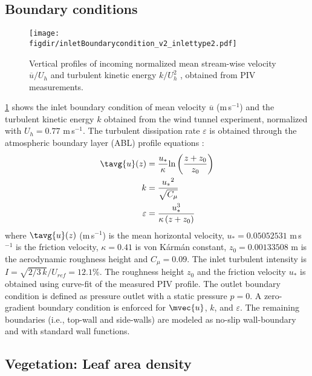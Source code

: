 \subsection{Boundary conditions}

\begin{figure}[t]
	\centering
	\texttt{[image: \\figdir/inletBoundarycondition\_v2\_inlettype2.pdf]}
	\caption{Vertical profiles of incoming normalized  mean stream-wise velocity $\overline{u}/U_h$ and   turbulent kinetic energy $k/U_h^2$ , obtained from PIV measurements.}
	\label{fig:boundaryprofile}
\end{figure}

\cref{fig:boundaryprofile} shows the inlet boundary condition of mean velocity $\overline{u}$ (m\,s$^{-1}$) and the turbulent kinetic energy $k$ obtained from the wind tunnel experiment, normalized with $U_h = 0.77$ m\,s$^{-1}$. The turbulent dissipation rate $\varepsilon$ is obtained through the atmospheric boundary layer (ABL) profile equations \citep{Richards1993}:
\begin{align}
	\tavg{u}(z) &= \frac{{{u_*}}}{\kappa }{\text{ln}}\left( {\frac{{z + {z_0}}}{{{z_0}}}} \right) \\
	k &= \frac{{{u_*}^2}}{{\sqrt {{C_\mu }} }} \\
	\varepsilon  &= \frac{{u_*^3}}{{\kappa \left( {z + {z_0}} \right)}}
	\label{eq:ableq}
\end{align}
where $\tavg{u}(z)$ (m\,s$^{-1}$) is the mean horizontal velocity, $u_*= \num{0.05052531}$ m\,s$^{-1}$ is  the friction velocity, $\kappa=0.41$ is von K\'arm\'an constant, $z_0 = \num{0.00133508}$ m is the aerodynamic roughness height and $C_{\mu}=0.09$. The inlet turbulent intensity is $I = \sqrt{2/3\,k}/U_{ref} = 12.1 \%$. The roughness height $z_0$ and the friction velocity $u_*$ is obtained using curve-fit of the measured PIV profile. The outlet boundary condition is defined as pressure outlet with a static pressure $p=0$. A zero-gradient boundary condition is enforced for $\mvec{u}$, $k$, and $\varepsilon$. The remaining boundaries (i.e., top-wall and side-walls) are modeled as no-slip wall-boundary and with standard wall functions.

\subsection{Vegetation: Leaf area density}

